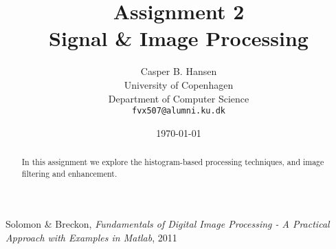 \documentclass[11pt]{article}
\title
{
    {\Large Assignment 2} \\
    Signal \& Image Processing
}
\author
{
    Casper B. Hansen\\
    University of Copenhagen\\
    Department of Computer Science\\
    {\tt fvx507@alumni.ku.dk}
}
\date{\today}
\begin{document}
\maketitle
\thispagestyle{empty}
\begin{multicols}{2}
    \begin{abstract}
        In this assignment we explore the histogram-based processing
        techniques, and image filtering and enhancement.
    \end{abstract}
    \tableofcontents
\end{multicols}
\clearpage



% 

\appendix


\begin{thebibliography}{9}

    Solomon \& Breckon,
    \emph{Fundamentals of Digital Image Processing - A Practical Approach with
    Examples in Matlab},
    2011

\end{thebibliography}
\end{document}
